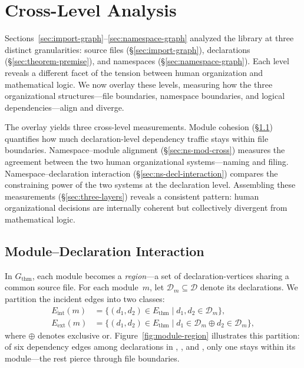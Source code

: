 \section{Cross-Level Analysis}
\label{sec:cross_level}
\label{sec:module-declaration}

Sections~\ref{sec:import-graph}--\ref{sec:namespace-graph} analyzed the library at three distinct granularities: source files (\S\ref{sec:import-graph}), declarations (\S\ref{sec:theorem-premise}), and namespaces (\S\ref{sec:namespace-graph}). Each level reveals a different facet of the tension between human organization and mathematical logic. We now overlay these levels, measuring how the three organizational structures---file boundaries, namespace boundaries, and logical dependencies---align and diverge.

The overlay yields three cross-level measurements. Module cohesion (\S\ref{sec:cohesion}) quantifies how much declaration-level dependency traffic stays within file boundaries. Namespace--module alignment (\S\ref{sec:ns-mod-cross}) measures the agreement between the two human organizational systems---naming and filing. Namespace--declaration interaction (\S\ref{sec:ns-decl-interaction}) compares the constraining power of the two systems at the declaration level. Assembling these measurements (\S\ref{sec:three-layers}) reveals a consistent pattern: human organizational decisions are internally coherent but collectively divergent from mathematical logic.

\subsection{Module--Declaration Interaction}
\label{sec:cohesion}

In $G_{\mathrm{thm}}$, each module becomes a \emph{region}---a set of declaration-vertices sharing a common source file. For each module~$m$, let $\mathcal{D}_m \subseteq \mathcal{D}$ denote its declarations. We partition the incident edges into two classes:
\begin{align*}
  E_{\mathrm{int}}(m) &= \{(d_1, d_2) \in E_{\mathrm{thm}} \mid d_1, d_2 \in \mathcal{D}_m\}, \\
  E_{\mathrm{ext}}(m) &= \{(d_1, d_2) \in E_{\mathrm{thm}} \mid d_1 \in \mathcal{D}_m \oplus d_2 \in \mathcal{D}_m\},
\end{align*}
where $\oplus$ denotes exclusive or. Figure~\ref{fig:module-region} illustrates this partition: of six dependency edges among declarations in , , and , only one stays within its module---the rest pierce through file boundaries.

